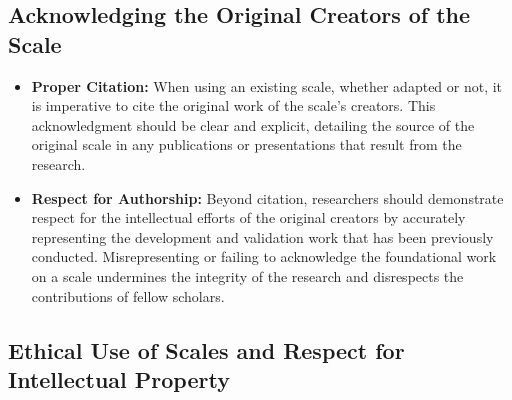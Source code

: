 \documentclass[
]{book}
\begin{document}
\hypertarget{acknowledging-the-original-creators-of-the-scale}{%
\subsection*{Acknowledging the Original Creators of the Scale}\label{acknowledging-the-original-creators-of-the-scale}}

\begin{itemize}
\item
  \textbf{Proper Citation:} When using an existing scale, whether adapted or not, it is imperative to cite the original work of the scale's creators. This acknowledgment should be clear and explicit, detailing the source of the original scale in any publications or presentations that result from the research.
\item
  \textbf{Respect for Authorship:} Beyond citation, researchers should demonstrate respect for the intellectual efforts of the original creators by accurately representing the development and validation work that has been previously conducted. Misrepresenting or failing to acknowledge the foundational work on a scale undermines the integrity of the research and disrespects the contributions of fellow scholars.
\end{itemize}

\hypertarget{ethical-use-of-scales-and-respect-for-intellectual-property}{%
\subsection*{Ethical Use of Scales and Respect for Intellectual Property}\label{ethical-use-of-scales-and-respect-for-intellectual-property}}
\end{document}
